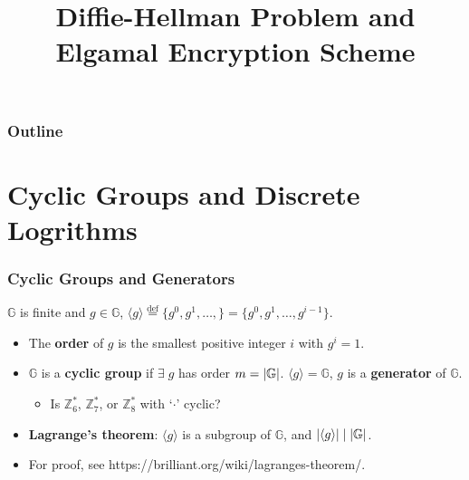 

\title{Diffie-Hellman Problem and Elgamal Encryption Scheme}


\maketitle
\begin{frame}
\frametitle{Outline}
\tableofcontents
\end{frame}
\section{Cyclic Groups and Discrete Logrithms}
\begin{frame}\frametitle{Cyclic Groups and Generators}
$\mathbb{G}$ is finite and $g \in \mathbb{G}$, 
$ \langle g \rangle \overset{\text{def}}{=} \{ g^0,g^1,\dotsc,\} = \{ g^0,g^1,\dotsc, g^{i-1}\}. $
\begin{itemize}
\item The \textbf{order} of $g$ is the smallest positive integer $i$ with $g^i=1$.
\item $\mathbb{G}$ is a \textbf{cyclic group} if $\exists\;g$ has order $m = \lvert\mathbb{G}\rvert$. $\langle g \rangle = \mathbb{G}$, $g$ is a \textbf{generator} of $\mathbb{G}$.
\begin{exampleblock}{}
\begin{itemize}
\item Is $\mathbb{Z}_6^*$, $\mathbb{Z}_7^*$, or $\mathbb{Z}_8^*$ with `$\cdot$' cyclic? %
\end{itemize}
\end{exampleblock}
\item \textbf{Lagrange's theorem}: $\langle g \rangle$ is a subgroup of $\mathbb{G}$, and $\lvert\langle g \rangle\rvert \mid \lvert\mathbb{G}\rvert$.
\item For proof, see https://brilliant.org/wiki/lagranges-theorem/.
\end{itemize}
\end{frame}
%
